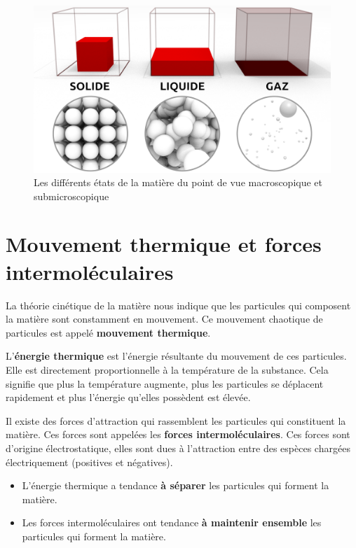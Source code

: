 \documentclass[
  11pt,
  a4paper,
  openany]{book}
\providecommand{\tightlist}{%
  \setlength{\itemsep}{0pt}\setlength{\parskip}{0pt}}
\begin{document}
\begin{figure}

{\centering \includegraphics[width=0.5\linewidth]{images/solide-liquide-gaz} 

}

\caption{Les différents états de la matière du point de vue macroscopique et submicroscopique}\label{fig:solide-liquide-gaz}
\end{figure}

\hypertarget{mouvement-thermique-et-forces-intermoluxe9culaires}{%
\section{Mouvement thermique et forces intermoléculaires}\label{mouvement-thermique-et-forces-intermoluxe9culaires}}

La théorie cinétique de la matière nous indique que les particules qui composent la matière sont constamment en mouvement. Ce mouvement chaotique de particules est appelé \textbf{mouvement thermique}.

L'\textbf{énergie thermique} est l'énergie résultante du mouvement de ces particules. Elle est directement proportionnelle à la température de la substance. Cela signifie que plus la température augmente, plus les particules se déplacent rapidement et plus l'énergie qu'elles possèdent est élevée.

Il existe des forces d'attraction qui rassemblent les particules qui constituent la matière. Ces forces sont appelées les \textbf{forces intermoléculaires}. Ces forces sont d'origine électrostatique, elles sont dues à l'attraction entre des espèces chargées électriquement (positives et négatives).

\begin{itemize}
\tightlist
\item
  L'énergie thermique a tendance \textbf{à séparer} les particules qui forment la matière.
\item
  Les forces intermoléculaires ont tendance \textbf{à maintenir ensemble} les particules qui forment la matière.
\end{itemize}
\end{document}
